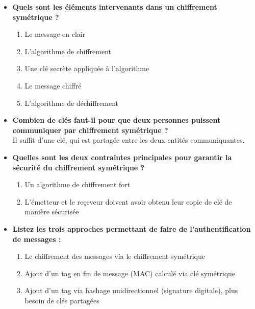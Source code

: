 \documentclass{report}
\begin{document}
			\begin{itemize}
				\item \textbf{Quels sont les éléments intervenants dans un chiffrement symétrique ?} \\

					\begin{enumerate}
						\item Le message en clair
						\item L'algorithme de chiffrement
						\item Une clé secrète appliquée à l'algorithme
						\item Le message chiffré
						\item L'algorithme de déchiffrement
					\end{enumerate}

				\item \textbf{Combien de clés faut-il pour que deux personnes puissent communiquer par chiffrement symétrique ?}\\

					Il suffit d'une clé, qui est partagée entre les deux entités communiquantes.\\

				\item \textbf{Quelles sont les deux contraintes principales pour garantir la sécurité du chiffrement symétrique ?}\\

					\begin{enumerate}
						\item Un algorithme de chiffrement fort
						\item L'émetteur et le reçeveur doivent avoir obtenu leur copie de clé de manière sécurisée\\
					\end{enumerate}

				\item \textbf{Listez les trois approches permettant de faire de l'authentification de messages :}\\

					\begin{enumerate}
						\item Le chiffrement des messages via le chiffrement symétrique
						\item Ajout d'un tag en fin de message (MAC) calculé via clé symétrique
						\item Ajout d'un tag via hashage unidirectionnel (signature digitale), plus besoin de clés partagées\\
					\end{enumerate}


\end{itemize}
\end{document}

